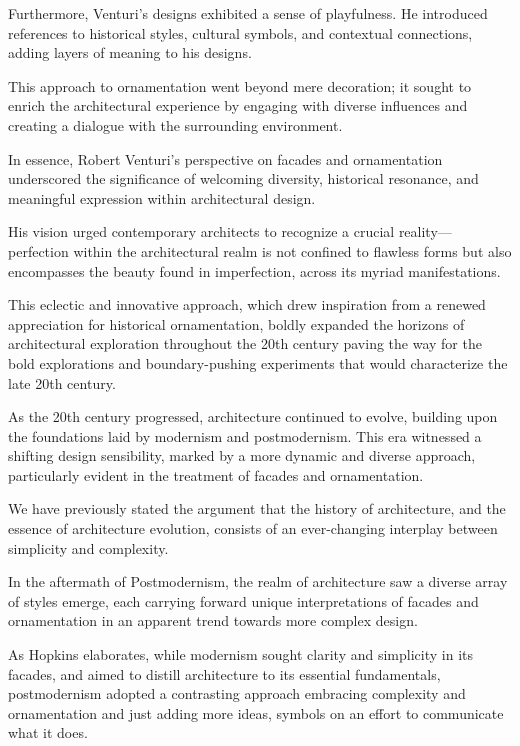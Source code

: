 Furthermore, Venturi's designs exhibited a sense of playfulness.
He introduced references to historical styles, cultural symbols, and contextual connections, adding layers of meaning to his designs.

This approach to ornamentation went beyond mere decoration;
it sought to enrich the architectural experience by engaging with diverse influences and creating a dialogue with the surrounding environment.

In essence, Robert Venturi's perspective on facades and ornamentation underscored the significance of welcoming diversity, historical resonance, and meaningful expression within architectural design.

His vision urged contemporary architects to recognize a crucial reality—perfection within the architectural realm is not confined to flawless forms but also encompasses the beauty found in imperfection, across its myriad manifestations\cite{Lutolli2020}.

This eclectic and innovative approach, which drew inspiration from a renewed appreciation for historical ornamentation, boldly expanded the horizons of architectural exploration throughout the 20th century\cite{Stamp2016} paving the way for the bold explorations and boundary-pushing experiments that would characterize the late 20th century.

As the 20th century progressed, architecture continued to evolve, building upon the foundations laid by modernism and postmodernism.
This era witnessed a shifting design sensibility, marked by a more dynamic and diverse approach, particularly evident in the treatment of facades and ornamentation.

We have previously stated the argument that the history of architecture, and the essence of architecture evolution, consists of an ever-changing interplay between simplicity and complexity.

In the aftermath of Postmodernism, the realm of architecture saw a diverse array of styles emerge, each carrying forward unique interpretations of facades and ornamentation in an apparent trend towards more complex design.

As Hopkins\cite{Hopkins2020} elaborates, while modernism sought clarity and simplicity in its facades, and aimed to distill architecture to its essential fundamentals, postmodernism adopted a contrasting approach embracing complexity and ornamentation and just adding more ideas, symbols on an effort to communicate what it does.


